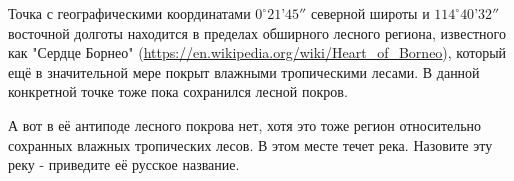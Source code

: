 
Точка с географическими координатами $0^{\circ}21’45''$ северной широты и $114^{\circ}40’32''$ 
восточной долготы находится в пределах обширного лесного региона, известного как "Сердце Борнео" (\url{https://en.wikipedia.org/wiki/Heart_of_Borneo}), который ещё в значительной мере покрыт влажными тропическими лесами. В данной конкретной точке тоже пока сохранился лесной покров.

А вот в её антиподе лесного покрова нет, хотя это тоже регион относительно сохранных влажных 
тропических лесов. В этом месте течет река. Назовите эту реку - приведите её русское название.


